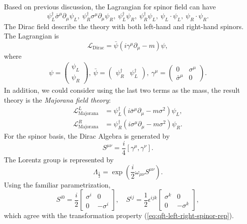 Based on previous discussion, the Lagrangian for spinor field can have
\begin{equation*}
	\psi_L^\dagger \bar\sigma^\mu \partial_\mu \psi_L,\ 
	\psi_R^\dagger \sigma^\mu \partial_\mu \psi_R,\ 
	\psi_L^\dagger \psi_R,\ \psi_R^\dagger \psi_L,\ 
	\psi_L \cdot \psi_L,\ \psi_R \cdot \psi_R.
\end{equation*}
The Dirac field describe the theory with both left-hand and right-hand spinors.
The Lagrangian is
\begin{equation}
	\mathcal{L}_{\mathrm{Dirac}}
	= \bar\psi \left(i\gamma^\mu \partial_\mu - m\right)\psi,
\end{equation}
where
\begin{eqnarray}
	\psi = \left(\begin{array}{c}
		\psi_L \\ \psi_R
	\end{array}\right),\ 
	\bar\psi = \left(\begin{array}{cc}
		\psi_R^\dagger & \psi_L^\dagger
	\end{array}\right),\ 
	\gamma^\mu = \left(\begin{array}{cc}
		0 & \sigma^\mu \\
		\bar\sigma^\mu & 0
	\end{array}\right).
\end{eqnarray}
In addition, we could consider using the last two terms as the mass, the result theory is the \textit{Majorana field theory}:
\begin{equation}
\begin{aligned}
	\mathcal{L}^{L}_{\mathrm{Majorana}}
	&= \psi_L^\dagger \left(i\bar\sigma^\mu \partial_\mu -m \sigma^2 \right) \psi_L, \\
	\mathcal{L}^{R}_{\mathrm{Majorana}}
	&= \psi_R^\dagger \left(i\sigma^\mu \partial_\mu -m \sigma^2 \right) \psi_R. 
\end{aligned}
\end{equation} 
For the spinor basis, the Dirac Algebra is generated by
\begin{equation}\label{eq:qft-diract-generator}
	S^{\mu\nu} = \frac{i}{4}[\gamma^\mu, \gamma^\nu].
\end{equation}
The Lorentz group is represented by
\begin{equation}\label{eq:qft-dirac-rep}
	\Lambda_{\frac{1}{2}} = \exp\left(\frac{i}{2}\omega_{\mu\nu} S^{\mu\nu}\right).
\end{equation}
Using the familiar parametrization,
\begin{equation}
	S^{i0} = \frac{i}{2}\left[\begin{array}{cc}
		\sigma^i & 0 \\ 0 & -\sigma^i
	\end{array}\right], \quad 
	S^{ij} = \frac{1}{2}\epsilon^{ijk} \left[\begin{array}{cc}
		\sigma^k & 0 \\ 0 & -\sigma^k
	\end{array}\right],
\end{equation}
which agree with the transformation property (\ref{eq:qft-left-right-spinor-rep}).



